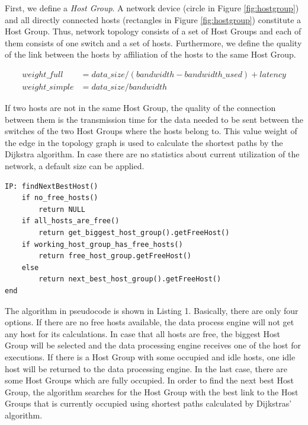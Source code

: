 First, we define a \textit{Host Group}. A network device (circle in Figure \ref{fig:hostgroup}) and all
directly connected hosts (rectangles in Figure \ref{fig:hostgroup}) constitute a Host Group.
Thus, network topology consists of a set of Host Groups and each of them consists of one switch and
a set of hosts. Furthermore, we define the quality of the link between the hosts by affiliation of
the hosts to the same Host Group.

\begin{align}
    weight\_full& = data\_size / (bandwidth - bandwidth\_used) + latency \\
    weight\_simple& = data\_size / bandwidth
\end{align}

If two hosts are not in the same Host Group, the quality of the connection between them is the
transmission time for the data needed to be sent between the switches of the two Host Groups where
the hosts belong to. This value weight of the edge in the topology graph is used to calculate the
shortest paths by the Dijkstra algorithm. In case there are no statistics about current utilization
of the network, a default size can be applied.\\

\begin{lstlisting}[caption=Algorithm of finding free hosts based on Host Group concept]
IP: findNextBestHost()
    if no_free_hosts()
        return NULL
    if all_hosts_are_free()
        return get_biggest_host_group().getFreeHost()
    if working_host_group_has_free_hosts()
        return free_host_group.getFreeHost()
    else
        return next_best_host_group().getFreeHost()
end
\end{lstlisting}

The algorithm in pseudocode is shown in Listing 1. Basically, there are only four options. If
there are no free hosts available, the data process engine will not get any host for its
calculations. In case that all hosts are free, the biggest Host Group will be selected and the data
processing engine receives one of the host for executions. If there is a Host Group with some
occupied and idle hosts, one idle host will be returned to the data processing engine. In the last
case, there are some Host Groups which are fully occupied. In order to find the next best Host
Group, the algorithm searches for the Host Group with the best link to the Host Groups that is
currently occupied using shortest paths calculated by Dijkstras' algorithm.

